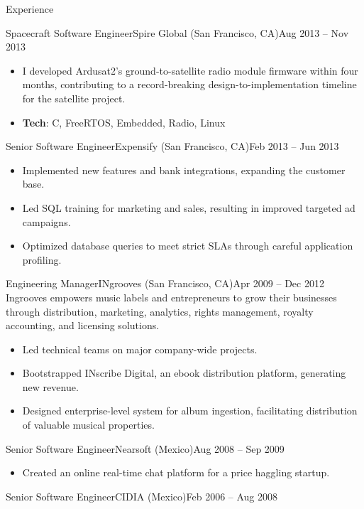 \documentclass[colibri]{mcdowellcv}
\begin{document}
\begin{cvsection}{Experience}
\begin{cvsubsection}{Spacecraft Software Engineer}{Spire Global (San Francisco, CA)}{Aug 2013 -- Nov 2013}
\begin{itemize}
    \item
      I developed Ardusat2's ground-to-satellite radio module firmware within four
      months, contributing to a record-breaking design-to-implementation timeline for
      the satellite project.
    \item \textbf{Tech}: C, FreeRTOS, Embedded, Radio, Linux
		\end{itemize}
	\end{cvsubsection}
	\begin{cvsubsection}{Senior Software Engineer}{Expensify (San Francisco, CA)}{Feb 2013 -- Jun 2013}
		\begin{itemize}
    \item
      Implemented new features and bank integrations, expanding the customer base.
    \item
      Led SQL training for marketing and sales, resulting in improved targeted
      ad campaigns.
    \item
      Optimized database queries to meet strict SLAs through careful application
      profiling.
		\end{itemize}
	\end{cvsubsection}
	\begin{cvsubsection}{Engineering Manager}{INgrooves (San Francisco, CA)}{Apr 2009 -- Dec 2012}
    Ingrooves empowers music labels and entrepreneurs to grow their businesses
    through distribution, marketing, analytics, rights management, royalty
    accounting, and licensing solutions.
		\begin{itemize}
    \item
      Led technical teams on major company-wide projects.
    \item
      Bootstrapped INscribe Digital, an ebook distribution platform, generating
      new revenue.
    \item
      Designed enterprise-level system for album ingestion, facilitating
      distribution of valuable musical properties.
    \end{itemize}
	\end{cvsubsection}
	\begin{cvsubsection}{Senior Software Engineer}{Nearsoft (Mexico)}{Aug 2008 -- Sep 2009}
		\begin{itemize}
    \item
      Created an online real-time chat platform for a price haggling startup.
		\end{itemize}
	\end{cvsubsection}
	\begin{cvsubsection}{Senior Software Engineer}{CIDIA (Mexico)}{Feb 2006 -- Aug 2008}

\end{cvsubsection}
\end{cvsection}
\end{document}
